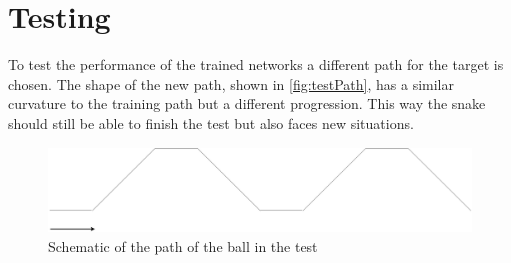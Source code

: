 \chapter{Testing}
To test the performance of the trained networks a different path for the target is chosen. The shape of the new path, shown in \autoref{fig:testPath}, has a similar curvature to the training path but a different progression. This way the snake should still be able to finish the test but also faces new situations. 

\begin{figure}[htpb]
  \centering
  \includegraphics[width=\textwidth]{figures/plots/testPath}
  \caption{ Schematic of the path of the ball in the test  }
  \label{fig:testPath}
\end{figure}
